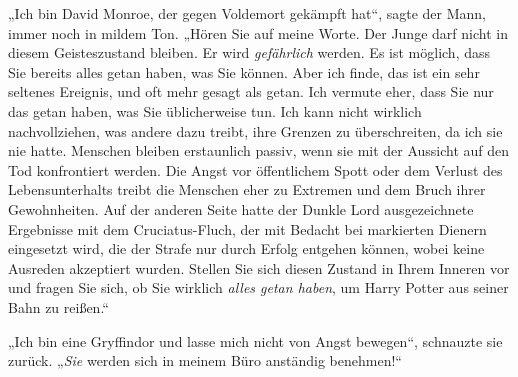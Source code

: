 „Ich bin David Monroe, der gegen Voldemort gekämpft hat“, sagte der Mann, immer noch in mildem Ton.
„Hören Sie auf meine Worte. Der Junge darf nicht in diesem Geisteszustand bleiben. Er wird \emph{gefährlich} werden. Es ist möglich, dass Sie bereits alles getan haben, was Sie können. Aber ich finde, das ist ein sehr seltenes Ereignis, und oft mehr gesagt als getan. Ich vermute eher, dass Sie nur das getan haben, was Sie üblicherweise tun. Ich kann nicht wirklich nachvollziehen, was andere dazu treibt, ihre Grenzen zu überschreiten, da ich sie nie hatte. Menschen bleiben erstaunlich passiv, wenn sie mit der Aussicht auf den Tod konfrontiert werden. Die Angst vor öffentlichem Spott oder dem Verlust des Lebensunterhalts treibt die Menschen eher zu Extremen und dem Bruch ihrer Gewohnheiten. Auf der anderen Seite hatte der Dunkle Lord ausgezeichnete Ergebnisse mit dem Cruciatus-Fluch, der mit Bedacht bei markierten Dienern eingesetzt wird, die der Strafe nur durch Erfolg entgehen können, wobei keine Ausreden akzeptiert wurden. Stellen Sie sich diesen Zustand in Ihrem Inneren vor und fragen Sie sich, ob Sie wirklich \emph{alles getan haben}, um Harry Potter aus seiner Bahn zu reißen.“

„Ich bin eine Gryffindor und lasse mich nicht von Angst bewegen“, schnauzte sie zurück. „\emph{Sie} werden sich in meinem Büro anständig benehmen!“

